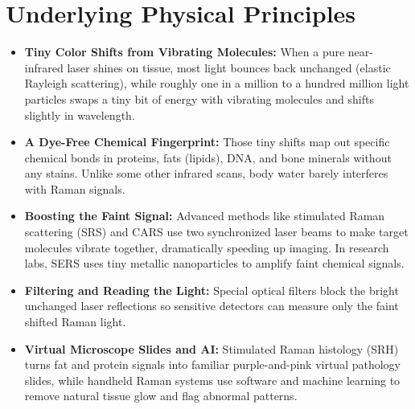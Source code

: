 \section{Underlying Physical Principles}
\begin{itemize}
  \item \textbf{Tiny Color Shifts from Vibrating Molecules:} When a pure near-infrared laser shines on tissue, most light bounces back unchanged (elastic Rayleigh scattering), while roughly one in a million to a hundred million light particles swaps a tiny bit of energy with vibrating molecules and shifts slightly in wavelength.
  \item \textbf{A Dye-Free Chemical Fingerprint:} Those tiny shifts map out specific chemical bonds in proteins, fats (lipids), DNA, and bone minerals without any stains. Unlike some other infrared scans, body water barely interferes with Raman signals.
  \item \textbf{Boosting the Faint Signal:} Advanced methods like stimulated Raman scattering (SRS) and CARS use two synchronized laser beams to make target molecules vibrate together, dramatically speeding up imaging. In research labs, SERS uses tiny metallic nanoparticles to amplify faint chemical signals.
  \item \textbf{Filtering and Reading the Light:} Special optical filters block the bright unchanged laser reflections so sensitive detectors can measure only the faint shifted Raman light.
  \item \textbf{Virtual Microscope Slides and AI:} Stimulated Raman histology (SRH) turns fat and protein signals into familiar purple-and-pink virtual pathology slides, while handheld Raman systems use software and machine learning to remove natural tissue glow and flag abnormal patterns.
\end{itemize}


